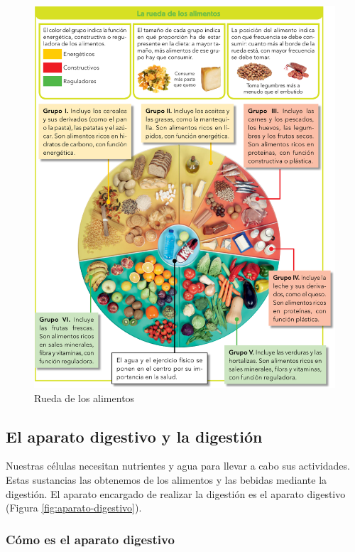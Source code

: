\begin{figure}[!ht]
    \centering
    \includegraphics[width=1\linewidth]{Tema3/01_Rueda_alimentos.png}
    \caption{Rueda de los alimentos}
    \label{fig:rueda-alimentos}
\end{figure}

\subsection{El aparato digestivo y la digestión}

Nuestras células necesitan nutrientes y agua para llevar a cabo sus actividades. Estas sustancias las obtenemos de los alimentos y las bebidas mediante la digestión. El aparato encargado de realizar la digestión es el aparato digestivo (Figura \ref{fig:aparato-digestivo}).

\subsubsection{Cómo es el aparato digestivo}

